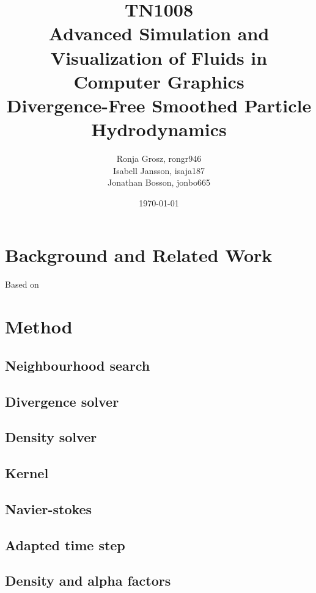 \documentclass[journal]{vgtc}                %
\title{\LARGE TN1008 \\ Advanced Simulation and Visualization of Fluids in Computer Graphics \\ \Large Divergence-Free Smoothed Particle Hydrodynamics}
\author{Ronja Grosz, rongr946\\ Isabell Jansson, isaja187\\ Jonathan Bosson, jonbo665}
\date{\today}
\begin{document}
\maketitle 

\section{Background and Related Work}
Based on~\cite{bender}

\section{Method}
\subsection{Neighbourhood search}
\subsection{Divergence solver}
\subsection{Density solver}
\subsection{Kernel}
\subsection{Navier-stokes}
\subsection{Adapted time step}
\subsection{Density and alpha factors}
\end{document}

